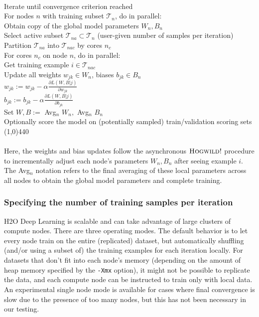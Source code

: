 \documentclass{article}[11pt]
\begin{document}
\\
Iterate until convergence criterion reached
\\
\indent For nodes $n$ with training subset $\mathcal{T}_n$, do in parallel:
\\
\indent \indent Obtain copy of the global model parameters $W_n, B_n$
\\
\indent \indent Select active subset $\mathcal{T}_{na} \subset \mathcal{T}_n$ (user-given number of samples per iteration)
\\
\indent \indent Partition $\mathcal{T}_{na}$ into $\mathcal{T}_{nac}$ by cores $n_c$
\\
\indent \indent For cores $n_c$ on node $n$, do in parallel:
\\
\indent \indent \indent Get training example $i \in \mathcal{T}_{nac}$
\\
\indent \indent \indent  Update all weights $w_{jk} \in W_n$, biases $b_{jk} \in B_n$
\\
\indent \indent \indent  \indent $w_{jk} := w_{jk} - \alpha \frac{\partial L(W,B | j)}{\partial w_{jk}}$
\\
\indent \indent \indent  \indent $b_{jk} := b_{jk} - \alpha \frac{\partial L(W,B | j)}{\partial b_{jk}}$
\\
\indent Set $W,B := $ Avg$_n$ $W_n,$ $ $Avg$_n$ $B_n$
\\
\indent Optionally score the model on (potentially sampled) train/validation scoring sets
\\
\line(1,0){440}
\\
\\
Here, the weights and bias updates follow the asynchronous  $\textsc{Hogwild!}$ procedure to incrementally adjust each node's parameters $W_n,B_n$ after seeing example $i$. The Avg$_n$ notation refers to the final averaging of these local parameters across all nodes to obtain the global model parameters and complete training.

\subsubsection{Specifying the number of training samples per iteration} 
\label{sssec:TrainSamplesPerIter}
H2O Deep Learning is scalable and can take advantage of large clusters of compute nodes. There are three operating modes. The default behavior is to let every node train on the entire (replicated) dataset, but automatically  shuffling (and/or using a subset of) the training examples for each iteration locally. For datasets that don't fit into each node's memory (depending on the amount of heap memory specified by the \texttt{-Xmx} option), it might not be possible to replicate the data, and each compute node can be instructed to train only with local data. An experimental single node mode is available for cases where final convergence is slow due to the presence of too many nodes, but this has not been necessary in our testing.
\end{document}
